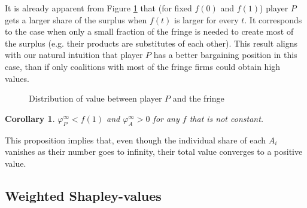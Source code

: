 \documentclass[a4paper]{article}
\newtheorem{corollary}{Corollary}
\begin{document}
It is already apparent from Figure \ref{fig:one_sided} that (for fixed $f(0)$ and $f(1)$) player $P$ gets a larger share of the surplus when $f(t)$ is larger for every $t$. It corresponds to the case when only a small fraction of the fringe is needed to create most of the surplus (e.g. their products are substitutes of each other). This result aligns with our natural intuition that player $P$ has a better bargaining position in this case, than if only coalitions with most of the fringe firms could obtain high values.

\begin{figure}
    \centering
    \caption{Distribution of value between player $P$ and the fringe}
    \label{fig:one_sided}
\end{figure}

\begin{corollary}
    \label{cor:fringe_value_2}
    $\varphi_P^\infty < f(1)$ and $\varphi_A^\infty > 0$ for any $f$ that is not constant.
\end{corollary}

This proposition implies that, even though the individual share of each $A_i$ vanishes as their number goes to infinity, their total value converges to a positive value.


\subsection{Weighted Shapley-values}
\end{document}
